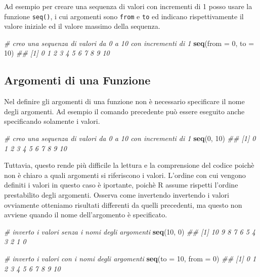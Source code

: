 \documentclass[
]{book}
\newenvironment{Shaded}{\begin{snugshade}}{\end{snugshade}}
\newcommand{\CommentTok}[1]{\textcolor[rgb]{0.56,0.35,0.01}{\textit{#1}}}
\newcommand{\DataTypeTok}[1]{\textcolor[rgb]{0.13,0.29,0.53}{#1}}
\newcommand{\DecValTok}[1]{\textcolor[rgb]{0.00,0.00,0.81}{#1}}
\newcommand{\KeywordTok}[1]{\textcolor[rgb]{0.13,0.29,0.53}{\textbf{#1}}}
\newcommand{\NormalTok}[1]{#1}
\begin{document}
{}

Ad esempio per creare una sequenza di valori con incrementi di 1 posso usare la funzione \texttt{seq()}, i cui argomenti sono \texttt{from} e \texttt{to} ed indicano rispettivamente il valore iniziale ed il valore massimo della sequenza.

\begin{Shaded}
\begin{Highlighting}[]
\CommentTok{# creo una sequenza di valori da 0 a 10 con incrementi di 1}
\KeywordTok{seq}\NormalTok{(}\DataTypeTok{from =} \DecValTok{0}\NormalTok{, }\DataTypeTok{to =} \DecValTok{10}\NormalTok{)}
\CommentTok{##  [1]  0  1  2  3  4  5  6  7  8  9 10}
\end{Highlighting}
\end{Shaded}

\hypertarget{function-arguments}{%
\subsection{Argomenti di una Funzione}\label{function-arguments}}

Nel definire gli argomenti di una funzione non è necessario specificare il nome degli argomenti. Ad esempio il comando precedente può essere eseguito anche specificando solamente i valori.

\begin{Shaded}
\begin{Highlighting}[]
\CommentTok{# creo una sequenza di valori da 0 a 10 con incrementi di 1}
\KeywordTok{seq}\NormalTok{(}\DecValTok{0}\NormalTok{, }\DecValTok{10}\NormalTok{)}
\CommentTok{##  [1]  0  1  2  3  4  5  6  7  8  9 10}
\end{Highlighting}
\end{Shaded}

Tuttavia, questo rende più difficile la lettura e la comprensione del codice poichè non è chiaro a quali argomenti si riferiscono i valori. L'ordine con cui vengono definiti i valori in questo caso è iportante, poichè R assume rispetti l'ordine prestabilito degli argomenti. Osserva come invertendo invertendo i valori ovviamente otteniamo risultati differenti da quelli precedenti, ma questo non avviene quando il nome dell'argomento è specificato.

\begin{Shaded}
\begin{Highlighting}[]
\CommentTok{# inverto i valori senza i nomi degli argomenti}
\KeywordTok{seq}\NormalTok{(}\DecValTok{10}\NormalTok{, }\DecValTok{0}\NormalTok{)}
\CommentTok{##  [1] 10  9  8  7  6  5  4  3  2  1  0}

\CommentTok{# inverto i valori con i nomi degli argomenti}
\KeywordTok{seq}\NormalTok{(}\DataTypeTok{to =} \DecValTok{10}\NormalTok{, }\DataTypeTok{from =} \DecValTok{0}\NormalTok{)}
\CommentTok{##  [1]  0  1  2  3  4  5  6  7  8  9 10}
\end{Highlighting}
\end{Shaded}
\end{document}
